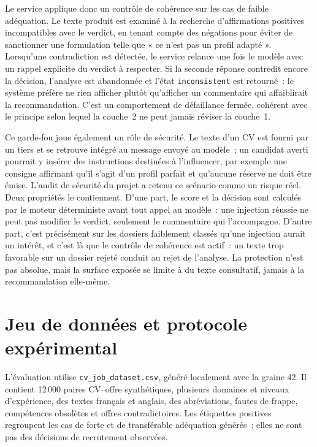Le service applique donc un contrôle de cohérence sur les cas de faible adéquation. Le texte produit est examiné à la recherche d'affirmations positives incompatibles avec le verdict, en tenant compte des négations pour éviter de sanctionner une formulation telle que « ce n'est pas un profil adapté ». Lorsqu'une contradiction est détectée, le service relance une fois le modèle avec un rappel explicite du verdict à respecter. Si la seconde réponse contredit encore la décision, l'analyse est abandonnée et l'état \texttt{inconsistent} est retourné~: le système préfère ne rien afficher plutôt qu'afficher un commentaire qui affaiblirait la recommandation. C'est un comportement de défaillance fermée, cohérent avec le principe selon lequel la couche~2 ne peut jamais réviser la couche~1.

Ce garde-fou joue également un rôle de sécurité. Le texte d'un CV est fourni par un tiers et se retrouve intégré au message envoyé au modèle~; un candidat averti pourrait y insérer des instructions destinées à l'influencer, par exemple une consigne affirmant qu'il s'agit d'un profil parfait et qu'aucune réserve ne doit être émise. L'audit de sécurité du projet a retenu ce scénario comme un risque réel. Deux propriétés le contiennent. D'une part, le score et la décision sont calculés par le moteur déterministe avant tout appel au modèle~: une injection réussie ne peut pas modifier le verdict, seulement le commentaire qui l'accompagne. D'autre part, c'est précisément sur les dossiers faiblement classés qu'une injection aurait un intérêt, et c'est là que le contrôle de cohérence est actif~: un texte trop favorable sur un dossier rejeté conduit au rejet de l'analyse. La protection n'est pas absolue, mais la surface exposée se limite à du texte consultatif, jamais à la recommandation elle-même.

\section{Jeu de données et protocole expérimental}

L'évaluation utilise \texttt{cv\_job\_dataset.csv}, généré localement avec la graine 42. Il contient 12\,000 paires CV--offre synthétiques, plusieurs domaines et niveaux d'expérience, des textes français et anglais, des abréviations, fautes de frappe, compétences obsolètes et offres contradictoires. Les étiquettes positives regroupent les cas de forte et de transférable adéquation générés~; elles ne sont pas des décisions de recrutement observées.

